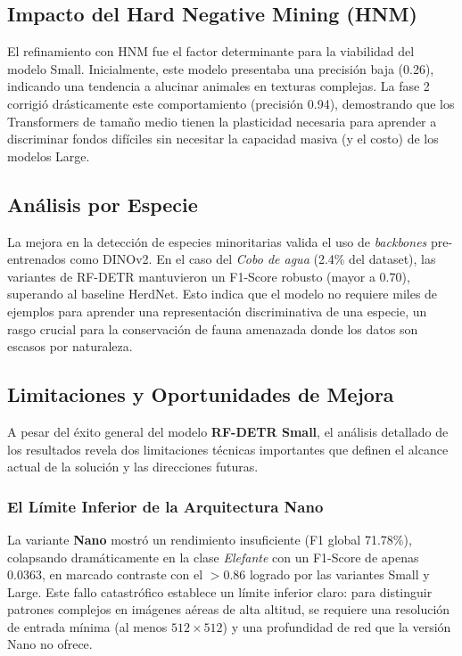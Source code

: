 \subsection{Impacto del Hard Negative Mining (HNM)}

El refinamiento con HNM fue el factor determinante para la viabilidad del modelo Small. Inicialmente, este modelo presentaba una precisión baja (0.26), indicando una tendencia a alucinar animales en texturas complejas. La fase 2 corrigió drásticamente este comportamiento (precisión 0.94), demostrando que los Transformers de tamaño medio tienen la plasticidad necesaria para aprender a discriminar fondos difíciles sin necesitar la capacidad masiva (y el costo) de los modelos Large.

\subsection{Análisis por Especie}

La mejora en la detección de especies minoritarias valida el uso de \textit{backbones} pre-entrenados como DINOv2. En el caso del \textit{Cobo de agua} (2.4\% del dataset), las variantes de RF-DETR mantuvieron un F1-Score robusto (mayor a 0.70), superando al baseline HerdNet. Esto indica que el modelo no requiere miles de ejemplos para aprender una representación discriminativa de una especie, un rasgo crucial para la conservación de fauna amenazada donde los datos son escasos por naturaleza.

\subsection{Limitaciones y Oportunidades de Mejora}

A pesar del éxito general del modelo \textbf{RF-DETR Small}, el análisis detallado de los resultados revela dos limitaciones técnicas importantes que definen el alcance actual de la solución y las direcciones futuras.

\subsubsection{El Límite Inferior de la Arquitectura Nano}
La variante \textbf{Nano} mostró un rendimiento insuficiente (F1 global 71.78\%), colapsando dramáticamente en la clase \textit{Elefante} con un F1-Score de apenas 0.0363, en marcado contraste con el $>0.86$ logrado por las variantes Small y Large. Este fallo catastrófico establece un límite inferior claro: para distinguir patrones complejos en imágenes aéreas de alta altitud, se requiere una resolución de entrada mínima (al menos $512 \times 512$) y una profundidad de red que la versión Nano no ofrece.

